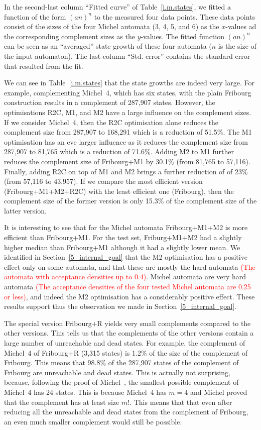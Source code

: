 In the second-last column ``Fitted curve'' of Table~\ref{i.m.states}, we fitted a function of the form $(an)^n$ to the measured four data points. These data points consist of the sizes of the four Michel automata (3, 4, 5, and 6) as the $x$-values ad the corresponding complement sizes as the $y$-values. The fitted function $(an)^n$ can be seen as an ``averaged'' state growth of these four automata ($n$ is the size of the input automaton). The last column ``Std. error'' contains the standard error that resulted from the fit.

We can see in Table~\ref{i.m.states} that the state growths are indeed very large. For example, complementing Michel~4, which has six states, with the plain Fribourg construction results in a complement of 287,907 states. However, the optimisations R2C, M1, and M2 have a large influence on the complement sizes. If we consider Michel~4, then the R2C optimisation alone reduces the complement size from 287,907 to 168,291 which is a reduction of 51.5\%. The M1 optimisation has an eve larger influence as it reduces the complement size from 287,907 to 81,765 which is a reduction of 71.6\%. Adding M2 to M1 further reduces the complement size of Fribourg+M1 by 30.1\% (from 81,765 to 57,116). Finally, adding R2C on top of M1 and M2 brings a further reduction of of 23\% (from 57,116 to 43,957). If we compare the most efficient version (Fribourg+M1+M2+R2C) with the least efficient one (Fribourg), then the complement size of the former version is only 15.3\% of the complement size of the latter version.

It is interesting to see that for the Michel automata Fribourg+M1+M2 is more efficient than Fribourg+M1. For the \goal{} test set, Friburg+M1+M2 had a slightly higher median than Fribourg+M1 although it had a slightly lower mean. We identified in Section~\ref{5_internal_goal} that the M2 optimisation has a positive effect only on some automata, and that these are mostly the hard automata \textcolor{red}{(The automata with acceptance densities up to 0.4)}. Michel automata are very hard automata \textcolor{red}{(The acceptance densities of the four tested Michel automata are 0.25 or less)}, and indeed the M2 optimisation has a considerably positive effect. These results support thus the observation we made in Section~\ref{5_internal_goal}.

The special version Fribourg+R yields very small complements compared to the other versions. This tells us that the complements of the other versions contain a large number of unreachable and dead states. For example, the complement of Michel~4 of Fribourg+R (3,315 states) is 1.2\% of the size of the complement of Fribourg. This means that 98.8\% of the 287,907 states of the complement of Fribourg are unreachable and dead states. This is actually not surprising, because, following the proof of Michel~\cite{michel1988}\cite{1996_thomas}, the smallest possible complement of Michel~4 has 24 states. This is because Michel~4 has $m=4$ and Michel proved that the complement has at least size $m!$. This means that that even after reducing all the unreachable and dead states from the complement of Fribourg, an even much smaller complement would still be possible.

